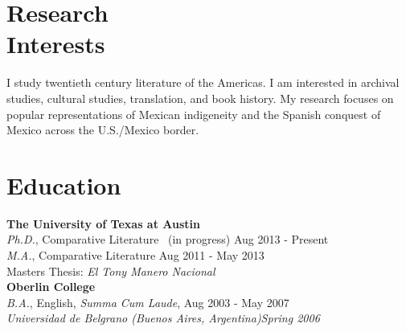 \documentclass[margin,centered]{resume}
\newcommand{\pubtitle}[1]{\textsl{#1}}
\newcommand{\employerName}[1]{\textbf{#1}}
\begin{document}
\thispagestyle{empty} %
\address{halperta@gmail.com}
\begin{resume}


    \vspace{5mm}

    \section{\mysidestyle Research\\Interests}

    I study twentieth century literature of the Americas. I am interested in archival studies, cultural studies, translation, and book history. My research focuses on popular representations of Mexican indigeneity and the Spanish conquest of Mexico across the U.S./Mexico border.


    \vspace{0mm}

    \section{\mysidestyle Education}

    {\employerName{The University of Texas at Austin}}\\
	{\sl Ph.D.}, Comparative Literature ~(in progress) \hfill Aug 2013 - Present\\
    {\sl M.A.}, Comparative Literature \hfill Aug 2011 - May 2013 \\
    Masters Thesis: \pubtitle{El Tony Manero Nacional}\\
    
    \employerName{Oberlin College}\\
	{\sl B.A.}, English, \emph{Summa Cum Laude}, \hfill Aug 2003 - May 2007 \\ 
	{\sl Universidad de Belgrano (Buenos Aires, Argentina)\hfill Spring 2006}\\

    \vspace{-2mm}


\end{resume}
\end{document}
